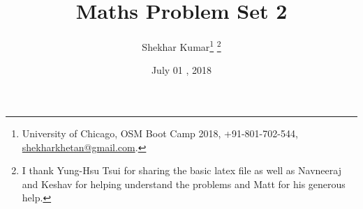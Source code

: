 \documentclass[letterpaper,12pt]{article}
\theoremstyle{definition}
\begin{document}
	
	\title{Maths Problem Set 2\\
	}
	\author{
		Shekhar Kumar\footnote{University of Chicago, OSM Boot Camp 2018, +91-801-702-544, \href{mailto:}{shekharkhetan@gmail.com}.} \footnote{I thank Yung-Hsu Tsui for sharing the basic latex file as well as Navneeraj and Keshav for helping understand the problems and Matt for his generous help.}\\[-2pt]
	}
	\date{July 01 ,  2018 }
	\vspace{-9mm}
	\maketitle
	\thispagestyle{empty}
	
	\pagestyle{fancy}
	\fancyhf{}
	\cfoot{\thepage}
	
\end{document}
